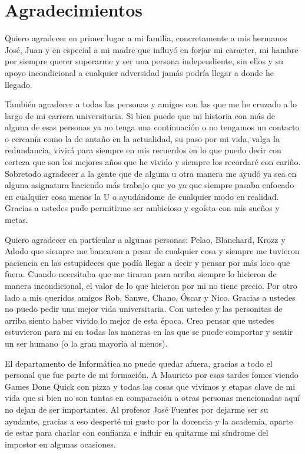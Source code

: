 \documentclass[11pt]{report}
\begin{document}
	

	\pagestyle{empty}
    
    \pagestyle{plain}

	\chapter*{Agradecimientos}


Quiero agradecer en primer lugar a mi familia, concretamente a mis hermanos José, Juan y en especial a mi madre que influyó en forjar mi caracter, mi hambre por siempre querer superarme y ser una persona independiente, sin ellos y su apoyo incondicional a cualquier adversidad jamás podría llegar a donde he llegado.

También agradecer a todas las personas y amigos con las que me he cruzado a lo largo de mi carrera universitaria. Si bien puede que mi historia con más de alguna de esas personas ya no tenga una continuación o no tengamos un contacto o cercanía como la de antaño en la actualidad, su paso por mi vida, valga la redundancia, vivirá para siempre en mis recuerdos en lo que puedo decir con certeza que son los mejores años que he vivido y siempre los recordaré con cariño. Sobretodo agradecer a la gente que de alguna u otra manera me ayudó ya sea en alguna asignatura haciendo más trabajo que yo ya que siempre pasaba enfocado en cualquier cosa menos la U o ayudándome de cualquier modo en realidad. Gracias a ustedes pude permitirme ser ambicioso y egoísta con mis sueños y metas.

Quiero agradecer en partícular a algunas personas: Pelao, Blanchard, Krozz y Adodo que siempre me bancaron a pesar de cualquier cosa y siempre me tuvieron paciencia en las estupideces que podía llegar a decir y pensar por más loco que fuera. Cuando necesitaba que me tiraran para arriba siempre lo hicieron de manera incondicional, el valor de lo que hicieron por mi no tiene precio. Por otro lado a mis queridos amigos Rob, Sanwe, Chano, Óscar y Nico. Gracias a ustedes no puedo pedir una mejor vida universitaria. Con ustedes y las personitas de arriba siento haber vivido lo mejor de esta época. Creo pensar que ustedes estuvieron para mi en todas las maneras en las que se puede comportar y sentir un ser humano (o la gran mayoría al menos).


El departamento de Informática no puede quedar afuera, gracias a todo el personal que fue parte de mi formación. A Mauricio por esas tardes fomes viendo Games Done Quick con pizza y todas las cosas que vivimos y etapas clave de mi vida que si bien no son tantas en comparación a otras personas mencionadas aquí no dejan de ser importantes. Al profesor José Fuentes por dejarme ser su ayudante, gracias a eso desperté mi gusto por la docencia y la academia, aparte de estar para charlar con confianza e influir en quitarme mi síndrome del impostor en algunas ocasiones.
\end{document}
